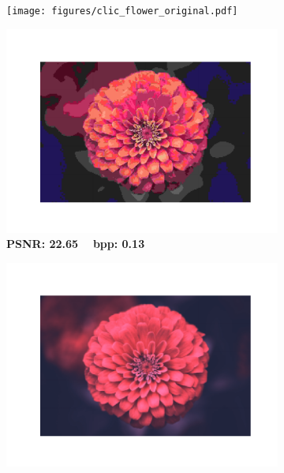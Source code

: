 \begin{figure}[t]
	\begin{subfigure}{.23\textwidth}
		\centering
		\texttt{[image: figures/clic\_flower\_original.pdf]}
        \vspace{-20pt}
        \caption*{}
	\end{subfigure}%
	\begin{subfigure}{.23\textwidth}
		\centering
		\includegraphics[trim=1.7cm 1.5cm 1.7cm 1.7cm, clip, width=1\textwidth]{figures/clic_flower_JPEG_bpp_0.137.pdf}
        \vspace{-20pt}
        \caption*{\tiny \textbf{PSNR: 22.65 ~ bpp: 0.13}}
	\end{subfigure}
    \begin{subfigure}{.23\textwidth}
		\centering
		\includegraphics[trim=1.7cm 1.5cm 1.7cm 1.7cm, clip, width=1\textwidth]{figures/clic_flower_SVD_bpp_0.123.pdf}

\end{subfigure}
\end{figure}
